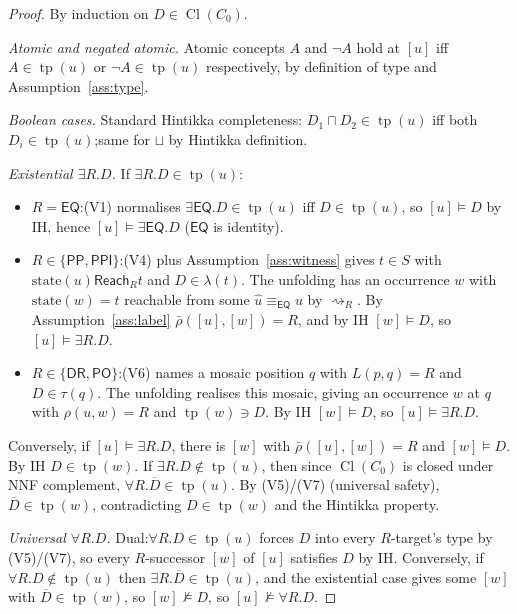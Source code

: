 \documentclass[11pt]{article}
\newcommand{\Cl}{\operatorname{Cl}}
\newcommand{\EQ}{\mathsf{EQ}}
\newcommand{\PP}{\mathsf{PP}}
\newcommand{\PPI}{\mathsf{PPI}}
\newcommand{\PO}{\mathsf{PO}}
\newcommand{\DR}{\mathsf{DR}}
\newcommand{\eqrel}{\equiv_{\EQ}}
\newcommand{\reach}{\rightsquigarrow}
\newcommand{\Reach}{\mathrel{\mathsf{Reach}}}
\newcommand{\tp}{\operatorname{tp}}
\begin{document}
\begin{proof}
By induction on \(D \in \Cl(C_0)\).

\emph{Atomic and negated atomic.}  Atomic concepts \(A\) and
\(\neg A\) hold at \([u]\) iff \(A \in \tp(u)\) or
\(\neg A \in \tp(u)\) respectively, by definition of type and
Assumption~\ref{ass:type}.

\emph{Boolean cases.}  Standard Hintikka completeness:\@
\(D_1 \sqcap D_2 \in \tp(u)\) iff both \(D_i \in \tp(u)\);\@ same
for \(\sqcup\) by Hintikka definition.

\emph{Existential \(\exists R.D\).}
If \(\exists R.D \in \tp(u)\):
\begin{itemize}[leftmargin=2em]
  \item \(R = \EQ\):\@ (V1) normalises \(\exists\EQ.D \in \tp(u)\) iff
    \(D \in \tp(u)\), so \([u] \models D\) by IH, hence
    \([u] \models \exists\EQ.D\) (\(\EQ\) is identity).
  \item \(R \in \{\PP,\PPI\}\):\@ (V4) plus
    Assumption~\ref{ass:witness} gives \(t \in S\) with
    \(\mathrm{state}(u) \Reach_R t\) and \(D \in \lambda(t)\).
    The unfolding has an occurrence \(w\) with
    \(\mathrm{state}(w) = t\) reachable from some
    \(\widehat u \eqrel u\) by \(\reach_R\).  By
    Assumption~\ref{ass:label} \(\bar\rho([u], [w]) = R\), and by IH
    \([w] \models D\), so \([u] \models \exists R.D\).
  \item \(R \in \{\DR,\PO\}\):\@ (V6) names a mosaic position
    \(q\) with \(L(p, q) = R\) and \(D \in \tau(q)\).  The
    unfolding realises this mosaic, giving an occurrence \(w\) at
    \(q\) with \(\rho(u, w) = R\) and \(\tp(w) \ni D\).  By IH
    \([w] \models D\), so \([u] \models \exists R.D\).
\end{itemize}
Conversely, if \([u] \models \exists R.D\), there is \([w]\) with
\(\bar\rho([u], [w]) = R\) and \([w] \models D\).  By IH
\(D \in \tp(w)\).  If \(\exists R.D \notin \tp(u)\), then since
\(\Cl(C_0)\) is closed under NNF complement,
\(\forall R.\overline D \in \tp(u)\).  By (V5)/(V7)
(universal safety), \(\overline D \in \tp(w)\), contradicting
\(D \in \tp(w)\) and the Hintikka property.

\emph{Universal \(\forall R.D\).}  Dual:\@ \(\forall R.D \in \tp(u)\)
forces \(D\) into every \(R\)-target's type by (V5)/(V7), so every
\(R\)-successor \([w]\) of \([u]\) satisfies \(D\) by IH.
Conversely, if \(\forall R.D \notin \tp(u)\) then
\(\exists R.\overline D \in \tp(u)\), and the existential case gives
some \([w]\) with \(\overline D \in \tp(w)\), so \([w] \not\models D\),
so \([u] \not\models \forall R.D\).
\end{proof}
\end{document}
